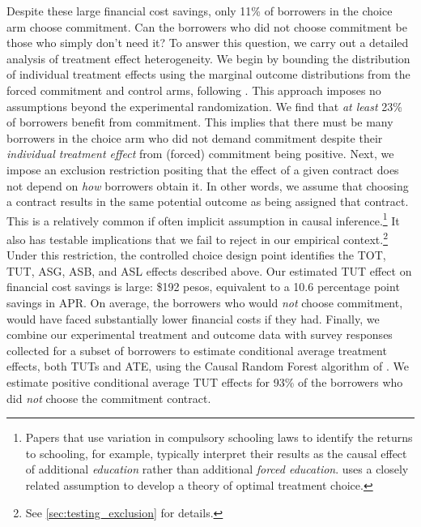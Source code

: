 \documentclass[12pt, a4paper]{article}
\begin{document}
Despite these large financial cost savings, only 11\% of borrowers in the choice arm choose commitment. 
Can the borrowers who did not choose commitment be those who simply don't need it? 
To answer this question, we carry out a detailed analysis of treatment effect heterogeneity.
We begin by bounding the distribution of individual treatment effects using the marginal outcome distributions from the forced commitment and control arms, following \cite{fan2010sharp}. This approach imposes no assumptions beyond the experimental randomization. We find that \textit{at least} 23\% of borrowers benefit from commitment. This implies that there must be many borrowers in the choice arm who did not demand commitment despite their \emph{individual treatment effect} from (forced) commitment being positive. Next, we impose an exclusion restriction positing that the effect of a given contract does not depend on \emph{how} borrowers obtain it. In other words, we assume that choosing a contract results in the same potential outcome as being assigned that contract. This is a relatively common if often implicit assumption in causal inference.\footnote{Papers that use variation in compulsory schooling laws to identify the returns to schooling, for example, typically interpret their results as the causal effect of additional \emph{education} rather than additional \emph{forced education}. \cite{chamberlain2011bayesian} uses a closely related assumption to develop a theory of optimal treatment choice.} 
It also has testable implications that we fail to reject in our empirical context.\footnote{See \autoref{sec:testing_exclusion} for details.}
Under this restriction, the controlled choice design point identifies the TOT, TUT, ASG, ASB, and ASL effects described above.  Our estimated TUT effect on financial cost savings is large: \$192 pesos, equivalent to a 10.6 percentage point savings in APR. On average, the borrowers who would \textit{not} choose commitment, would have faced substantially lower financial costs if they had. Finally, we combine our experimental treatment and outcome data with survey responses collected for a subset of borrowers to estimate conditional average treatment effects, both TUTs and ATE, using the Causal Random Forest algorithm of \cite{atheygrf}. We estimate positive conditional average TUT effects for 93\% of the borrowers who did \textit{not} choose the commitment contract. 
\end{document}
